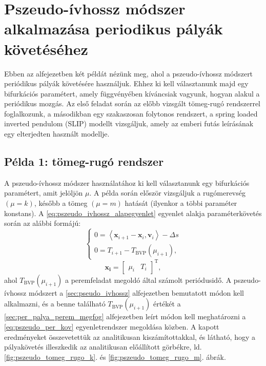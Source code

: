 \section{Pszeudo-ívhossz módszer alkalmazása periodikus pályák kö\-ve\-té\-sé\-hez}

Ebben az alfejezetben két példát nézünk meg, ahol a pszeudo-ívhossz mód\-szert periódikus pályák követésére használjuk.
Ehhez ki kell választanunk majd egy bifurkációs paramétert, amely függvényében kíváncsiak vagyunk, hogyan alakul a periódikus mozgás.
Az első feladat során az előbb vizsgált tömeg-rugó rendszerrel foglalkozunk, a másodikban egy szakaszosan folytonos rendszert, a spring loaded inverted pendulom (SLIP) modellt vizsgáljuk, amely az emberi futás leírásának egy elterjedten használt modellje.

\subsection{Példa 1: tömeg-rugó rendszer}

A pszeudo-ívhossz módszer használatához ki kell választanunk egy bi\-fur\-ká\-ci\-ós paramétert, amit jelöljön $\mu$.
A példa során először vizsgáljuk a rugómerevség $(\mu = k)$, később a tömeg $(\mu =m)$ hatását (ilyenkor a többi paraméter konstans).
A \eqref{eq:pszeudo_ivhossz_alapegyenlet} egyenlet alakja paraméterkövetés során az alábbi formájú:
\begin{equation}
\begin{cases}
0 = \left< \mathbf{x}_{i+1} - \mathbf{x}_i, \mathbf{v}_i \right> - \Delta s \\
0 = T_{i+1} - T_{\mathrm{BVP}}(\mu_{i+1}),
\end{cases}
\label{eq:pszeudo_per_kov}
\end{equation}
\begin{equation}
\mathbf{x_i}= \begin{bmatrix}
\mu_{i} & T_{i}
\end{bmatrix}^\mathrm{T},
\end{equation}
ahol $T_{\mathrm{BVP}}(\mu_{i+1})$ a peremfeladat megoldó által számolt periódusidő.
A psze\-u\-do-ív\-hossz módszert a \ref{sec:pseudo_ivhossz} alfejezetben bemutatott módon kell alkalmazni, és a benne található $T_{\mathrm{BVP}}(\mu_{i+1})$ értékét a \ref{sec:per_palya_perem_megfog} alfejezetben leírt módon kell meghatározni a \eqref{eq:pszeudo_per_kov} egyenletrendszer megoldása közben.
A kapott eredményeket összevetettük az analitikusan kiszámítottakkal, és látható, hogy a pályakövetés illeszkedik az analitikusan előállított görbékre, ld. \ref{fig:pszeudo_tomeg_rugo_k}. és \ref{fig:pszeudo_tomeg_rugo_m}. ábrák.

